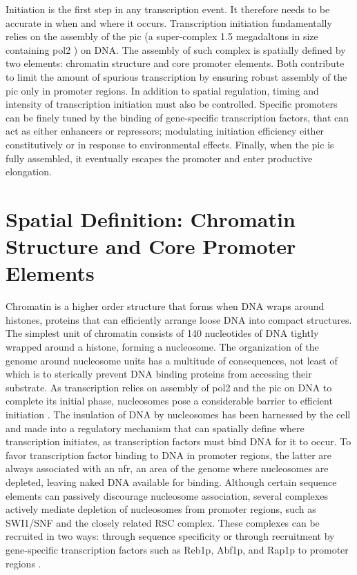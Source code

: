 Initiation is the first step in any transcription event. 
It therefore needs to be accurate in when and where it occurs. 
Transcription initiation fundamentally relies on the assembly of the \gls{pic} (a super-complex 1.5 megadaltons in size  containing \gls{pol2} \cite{fazal:2015:realtime}) on DNA.
The assembly of such complex is spatially defined by two elements: chromatin structure and core promoter elements.
Both contribute to limit the amount of spurious transcription by ensuring robust assembly of the \gls{pic} only in promoter regions.
In addition to spatial regulation, timing and intensity of transcription initiation must also be controlled.
Specific promoters can be finely tuned by the binding of gene-specific transcription factors, that can act as either enhancers or repressors; modulating initiation efficiency either constitutively or in response to environmental effects. 
Finally, when the \gls{pic} is fully assembled, it eventually escapes the promoter and enter productive elongation.

\singlespacing
\section{Spatial Definition: Chromatin Structure and Core Promoter Elements}
\doublespacing

Chromatin is a higher order structure that forms when DNA wraps around histones, proteins that can efficiently arrange loose DNA into compact structures.
The simplest unit of chromatin consists of 140 nucleotides of DNA tightly wrapped around a histone, forming a nucleosome.
The organization of the genome around nucleosome units has a multitude of consequences, not least of which is to sterically prevent DNA binding proteins from accessing their substrate. 
As transcription relies on assembly of \gls{pol2} and the \gls{pic} on DNA to complete its initial phase, nucleosomes pose a considerable barrier to efficient initiation \cite{field:2008:distinct,jiang:2009:compiled}.
The insulation of DNA by nucleosomes has been harnessed by the cell and made into a regulatory mechanism that can spatially define where transcription initiates, as transcription factors must bind DNA for it to occur. 
To favor transcription factor binding to DNA in promoter regions, the latter are always associated with an \gls{nfr}, an area of the genome where nucleosomes are depleted, leaving naked DNA available for binding.
Although certain sequence elements can passively discourage nucleosome association, several complexes  actively mediate depletion of nucleosomes from promoter regions, such as SWI1/SNF and the closely related RSC complex.
These complexes can be recruited in two ways: through sequence specificity \cite{badis:2008:library, knight:2014:two} or through recruitment by gene-specific transcription factors such as Reb1p, Abf1p, and Rap1p to promoter regions \citep{floer:2010:rscnucleosome, hartley:2009:mechanisms, spain:2014:rsc, badis:2008:library}.

